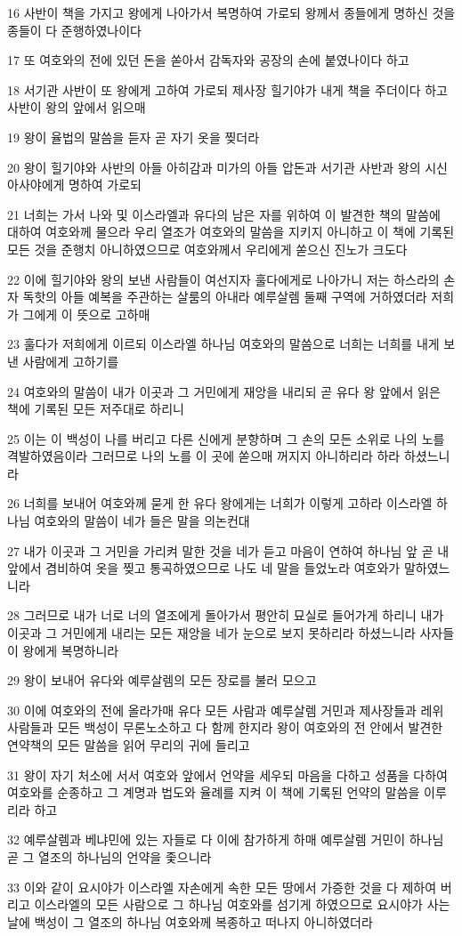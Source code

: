 \par 16 사반이 책을 가지고 왕에게 나아가서 복명하여 가로되 왕께서 종들에게 명하신 것을 종들이 다 준행하였나이다
\par 17 또 여호와의 전에 있던 돈을 쏟아서 감독자와 공장의 손에 붙였나이다 하고
\par 18 서기관 사반이 또 왕에게 고하여 가로되 제사장 힐기야가 내게 책을 주더이다 하고 사반이 왕의 앞에서 읽으매
\par 19 왕이 율법의 말씀을 듣자 곧 자기 옷을 찢더라
\par 20 왕이 힐기야와 사반의 아들 아히감과 미가의 아들 압돈과 서기관 사반과 왕의 시신 아사야에게 명하여 가로되
\par 21 너희는 가서 나와 및 이스라엘과 유다의 남은 자를 위하여 이 발견한 책의 말씀에 대하여 여호와께 물으라 우리 열조가 여호와의 말씀을 지키지 아니하고 이 책에 기록된 모든 것을 준행치 아니하였으므로 여호와께서 우리에게 쏟으신 진노가 크도다
\par 22 이에 힐기야와 왕의 보낸 사람들이 여선지자 훌다에게로 나아가니 저는 하스라의 손자 독핫의 아들 예복을 주관하는 살룸의 아내라 예루살렘 둘째 구역에 거하였더라 저희가 그에게 이 뜻으로 고하매
\par 23 훌다가 저희에게 이르되 이스라엘 하나님 여호와의 말씀으로 너희는 너희를 내게 보낸 사람에게 고하기를
\par 24 여호와의 말씀이 내가 이곳과 그 거민에게 재앙을 내리되 곧 유다 왕 앞에서 읽은 책에 기록된 모든 저주대로 하리니
\par 25 이는 이 백성이 나를 버리고 다른 신에게 분향하며 그 손의 모든 소위로 나의 노를 격발하였음이라 그러므로 나의 노를 이 곳에 쏟으매 꺼지지 아니하리라 하라 하셨느니라
\par 26 너희를 보내어 여호와께 묻게 한 유다 왕에게는 너희가 이렇게 고하라 이스라엘 하나님 여호와의 말씀이 네가 들은 말을 의논컨대
\par 27 내가 이곳과 그 거민을 가리켜 말한 것을 네가 듣고 마음이 연하여 하나님 앞 곧 내 앞에서 겸비하여 옷을 찢고 통곡하였으므로 나도 네 말을 들었노라 여호와가 말하였느니라
\par 28 그러므로 내가 너로 너의 열조에게 돌아가서 평안히 묘실로 들어가게 하리니 내가 이곳과 그 거민에게 내리는 모든 재앙을 네가 눈으로 보지 못하리라 하셨느니라 사자들이 왕에게 복명하니라
\par 29 왕이 보내어 유다와 예루살렘의 모든 장로를 불러 모으고
\par 30 이에 여호와의 전에 올라가매 유다 모든 사람과 예루살렘 거민과 제사장들과 레위 사람들과 모든 백성이 무론노소하고 다 함께 한지라 왕이 여호와의 전 안에서 발견한 연약책의 모든 말씀을 읽어 무리의 귀에 들리고
\par 31 왕이 자기 처소에 서서 여호와 앞에서 언약을 세우되 마음을 다하고 성품을 다하여 여호와를 순종하고 그 계명과 법도와 율례를 지켜 이 책에 기록된 언약의 말씀을 이루리라 하고
\par 32 예루살렘과 베냐민에 있는 자들로 다 이에 참가하게 하매 예루살렘 거민이 하나님 곧 그 열조의 하나님의 언약을 좇으니라
\par 33 이와 같이 요시야가 이스라엘 자손에게 속한 모든 땅에서 가증한 것을 다 제하여 버리고 이스라엘의 모든 사람으로 그 하나님 여호와를 섬기게 하였으므로 요시야가 사는 날에 백성이 그 열조의 하나님 여호와께 복종하고 떠나지 아니하였더라

